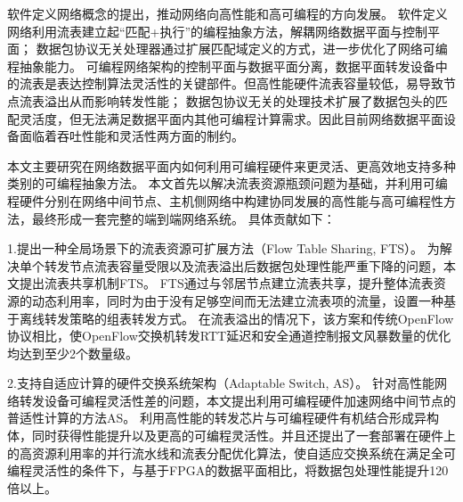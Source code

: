 
\setcounter{page}{1}

%
%
%

软件定义网络概念的提出，推动网络向高性能和高可编程的方向发展。
软件定义网络利用流表建立起“匹配+执行”的编程抽象方法，解耦网络数据平面与控制平面；
数据包协议无关处理器通过扩展匹配域定义的方式，进一步优化了网络可编程抽象能力。
可编程网络架构的控制平面与数据平面分离，数据平面转发设备中的流表是表达控制算法灵活性的关键部件。但高性能硬件流表容量较低，易导致节点流表溢出从而影响转发性能；
数据包协议无关的处理技术扩展了数据包头的匹配灵活度，但无法满足数据平面内其他可编程计算需求。因此目前网络数据平面设备面临着吞吐性能和灵活性两方面的制约。

本文主要研究在网络数据平面内如何利用可编程硬件来更灵活、更高效地支持多种类别的可编程抽象方法。
本文首先以解决流表资源瓶颈问题为基础，并利用可编程硬件分别在网络中间节点、主机侧网络中构建协同发展的高性能与高可编程性方法，最终形成一套完整的端到端网络系统。
具体贡献如下：


1.提出一种全局场景下的流表资源可扩展方法（Flow Table Sharing, FTS）。
为解决单个转发节点流表容量受限以及流表溢出后数据包处理性能严重下降的问题，本文提出流表共享机制FTS。
FTS通过与邻居节点建立流表共享，提升整体流表资源的动态利用率，同时为由于没有足够空间而无法建立流表项的流量，设置一种基于离线转发策略的组表转发方式。
在流表溢出的情况下，该方案和传统OpenFlow协议相比，使OpenFlow交换机转发RTT延迟和安全通道控制报文风暴数量的优化均达到至少2个数量级。

2.支持自适应计算的硬件交换系统架构（Adaptable Switch, AS）。
针对高性能网络转发设备可编程灵活性差的问题，本文提出利用可编程硬件加速网络中间节点的普适性计算的方法AS。
利用高性能的转发芯片与可编程硬件有机结合形成异构体，同时获得性能提升以及更高的可编程灵活性。并且还提出了一套部署在硬件上的高资源利用率的并行流水线和流表分配优化算法，使自适应交换系统在满足全可编程灵活性的条件下，与基于FPGA的数据平面相比，将数据包处理性能提升120倍以上。

